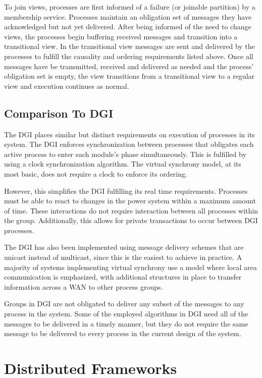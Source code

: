To join views, processes are first informed of a failure (or joinable partition) by a membership service. Processes maintain an obligation set of messages they have acknowledged but not yet delivered. After being informed of the need to change views, the processes begin buffering received messages and transition into a transitional view. In the transitional view messages are sent and delivered by the processes to fulfill the causality and ordering requirements listed above. Once all messages have be transmitted, received and delivered as needed and the process' obligation set is empty, the view transitions from a transitional view to a regular view and execution continues as normal.

\subsection{Comparison To DGI}

The DGI places similar but distinct requirements on execution of processes in its system. The DGI enforces synchronization between processes that obligates each active process to enter each module's phase simultaneously. This is fulfilled by using a clock synchronization algorithm. The virtual synchrony model, at its most basic, does not require a clock to enforce its ordering.

However, this simplifies the DGI fulfilling its real time requirements.  Processes must be able to react to changes in the power system within a maximum amount of time. These interactions do not require interaction between all processes within the group. Additionally, this allows for private transactions to occur between DGI processes. 

The DGI has also been implemented using message delivery schemes that are unicast instead of multicast, since this is the easiest to achieve in practice. A majority of systems implementing virtual synchrony use a model where local area communication is emphasized, with additional structures in place to transfer information across a WAN to other process groups.

Groups in DGI are not obligated to deliver any subset of the messages to any process in the system. Some of the employed algorithms in DGI need all of the messages to be delivered in a timely manner, but they do not require the same message to be delivered to every process in the current design of the system.

\section{Distributed Frameworks}

